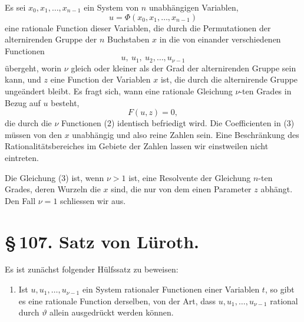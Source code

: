 \documentclass[11pt]{article}
\begin{document}
Es sei \(x_0,x_1,\ldots,x_{n-1}\) ein System von \(n\) unabhängigen Variablen,
\begin{equation}
u=\Phi(x_0,x_1,\ldots,x_{n-1})
\tag{1}
\end{equation}
eine rationale Function dieser Variablen, die durch die Permutationen der alternirenden Gruppe der \(n\) Buchstaben \(x\) in die von einander verschiedenen Functionen
\begin{equation}
u,\ u_1,\ u_2,\ldots,u_{\nu-1}
\tag{2}
\end{equation}
übergeht, worin \(\nu\) gleich oder kleiner als der Grad der alternirenden Gruppe sein kann, und \(z\) eine Function der Variablen \(x\) ist, die durch die alternirende Gruppe ungeändert bleibt. Es fragt sich, wann eine rationale Gleichung \(\nu\)-ten Grades in Bezug auf \(u\) besteht,
\begin{equation}
F(u,z)=0,
\tag{3}
\end{equation}
die durch die \(\nu\) Functionen (2) identisch befriedigt wird. Die Coefficienten in (3) müssen von den \(x\) unabhängig und also reine Zahlen sein. Eine Beschränkung des Rationalitätsbereiches im Gebiete der Zahlen lassen wir einstweilen nicht eintreten.

Die Gleichung (3) ist, wenn \(\nu>1\) ist, eine Resolvente der Gleichung \(n\)-ten Grades, deren Wurzeln die \(x\) sind, die nur von dem einen Parameter \(z\) abhängt. Den Fall \(\nu=1\) schliessen wir aus.

\section*{\S\,107. Satz von Lüroth.}

Es ist zunächst folgender Hülfssatz zu beweisen:

\begin{enumerate}[label=\arabic*.]
\item Ist \(u,u_1,\ldots,u_{\nu-1}\) ein System rationaler Functionen einer Variablen \(t\), so gibt es eine rationale Function derselben, von der Art, dass \(u,u_1,\ldots,u_{\nu-1}\) rational durch \(\vartheta\) allein ausgedrückt werden können.
\end{enumerate}
\end{document}
